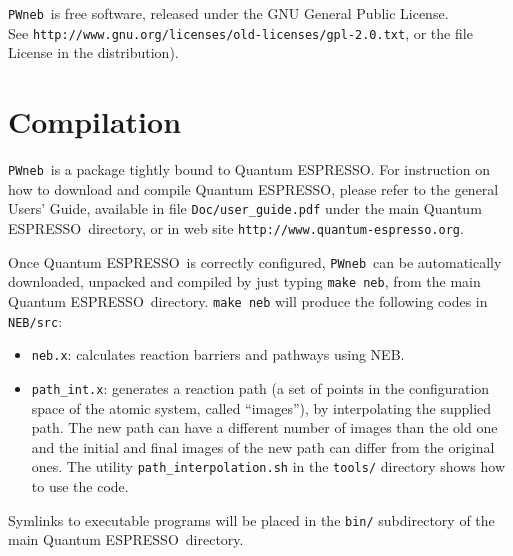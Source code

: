 \documentclass[12pt,a4paper]{article}
\def\qe{{\sc Quantum ESPRESSO}}
\def\NEB{\texttt{PWneb}} %
\def\nebx{\texttt{neb.x}}
\begin{document}
\NEB\ is free software, released under the 
GNU General Public License. \\ See
\texttt{http://www.gnu.org/licenses/old-licenses/gpl-2.0.txt}, 
or the file License in the distribution).
    


\section{Compilation}

\NEB\ is a package tightly bound to \qe.
For instruction on how to download and compile \qe, please refer 
to the general Users' Guide, available in file \texttt{Doc/user\_guide.pdf}
under the main \qe\ directory, or in web site 
\texttt{http://www.quantum-espresso.org}.

Once \qe\ is correctly configured, \NEB\ can be automatically 
downloaded, unpacked and compiled by
just typing \texttt{make neb}, from the main \qe\ directory.
\texttt{make neb} will produce 
the following codes in \texttt{NEB/src}:
\begin{itemize}
\item \nebx: calculates reaction barriers and pathways using NEB.
\item \texttt{path\_int.x}: generates a reaction path (a set of points
in the configuration space of the atomic system, called ``images''), by
 interpolating the supplied path. The new path can have a 
 different number of images than the old one and the initial and final 
 images of the new path can differ from the original ones.
 The utility \texttt{path\_interpolation.sh} in the \texttt{tools/}
 directory shows how to use the code.
\end{itemize}

Symlinks to executable programs will be placed in the
\texttt{bin/} subdirectory of the main \qe\  directory.
\end{document}
